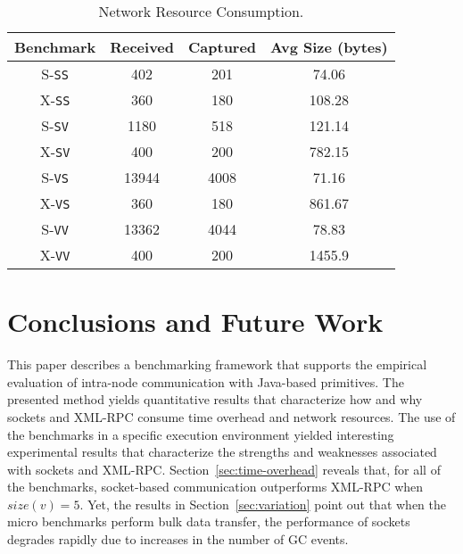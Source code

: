 \documentclass{sig-alternate}
\begin{document}
\begin{table}[t]

  \vspace*{.05in}
  \begin{center}
  \begin{tabular}{| c | c | c | c |}
  \hline
  Benchmark & Received & Captured &  Avg Size (bytes)\\
  \hline
  S-\texttt{SS} & 402 & 201 & 74.06\\
  X-\texttt{SS} & 360 & 180 & 108.28\\
  \hline
  S-\texttt{SV} & 1180 & 518 & 121.14\\
  X-\texttt{SV} & 400 & 200 & 782.15\\
  \hline
  S-\texttt{VS} & 13944 & 4008 & 71.16\\
  X-\texttt{VS} & 360 & 180 & 861.67\\
  \hline
  S-\texttt{VV} & 13362 & 4044 & 78.83\\
  X-\texttt{VV} & 400 & 200 & 1455.9\\
  \hline
  \end{tabular}
\end{center}

\vspace*{-.1in}

  \caption{Network Resource Consumption.}
  \label{tab:sover}
  \vspace*{-.1in}

\end{table}


\section{Conclusions and Future Work}
\label{sec:conclusions}

This paper describes a benchmarking framework that supports the
empirical evaluation of intra-node communication with Java-based
primitives.  The presented method yields quantitative results that
characterize how and why sockets and XML-RPC consume time overhead and
network resources.  The use of the benchmarks in a specific execution
environment yielded interesting experimental results that characterize
the strengths and weaknesses associated with sockets and XML-RPC.
Section~\ref{sec:time-overhead} reveals that, for all of the
benchmarks, socket-based communication outperforms XML-RPC when
$size(v)=5$.  Yet, the results in Section~\ref{sec:variation} point
out that when the micro benchmarks perform bulk data transfer, the
performance of sockets degrades rapidly due to increases in the number
of GC events.
\end{document}
